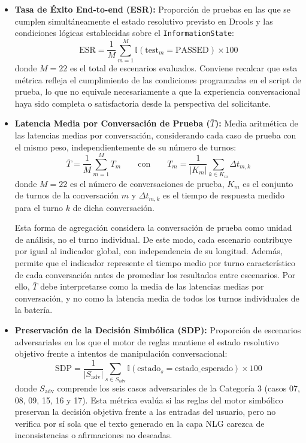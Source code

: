 \documentclass[12pt,a4paper]{report}
\begin{document}
\begin{itemize}
    \item \textbf{Tasa de Éxito End-to-end (ESR):} Proporción de pruebas en las que se cumplen simultáneamente el estado resolutivo previsto en Drools y las condiciones lógicas establecidas sobre el \texttt{InformationState}:
    \begin{equation}
        \text{ESR} = \frac{1}{M} \sum_{m=1}^{M} \mathbb{I}(\text{test}_m = \text{PASSED}) \times 100
    \end{equation}
    donde $M = 22$ es el total de escenarios evaluados. Conviene recalcar que esta métrica refleja el cumplimiento de las condiciones programadas en el script de prueba, lo que no equivale necesariamente a que la experiencia conversacional haya sido completa o satisfactoria desde la perspectiva del solicitante.

    \item \textbf{Latencia Media por Conversación de Prueba ($\bar{T}$):} Media aritmética de las latencias medias por conversación, considerando cada caso de prueba con el mismo peso, independientemente de su número de turnos:
    \begin{equation}
        \bar{T} = \frac{1}{M} \sum_{m=1}^{M} T_m
        \qquad \text{con} \qquad
        T_m = \frac{1}{|K_m|} \sum_{k \in K_m} \Delta t_{m,k}
    \end{equation}
    donde $M = 22$ es el número de conversaciones de prueba, $K_m$ es el conjunto de turnos de la conversación $m$ y $\Delta t_{m,k}$ es el tiempo de respuesta medido para el turno $k$ de dicha conversación.
    
     Esta forma de agregación considera la conversación de prueba como unidad de análisis, no el turno individual. De este modo, cada escenario contribuye por igual al indicador global, con independencia de su longitud. Además, permite que el indicador represente el tiempo medio por turno característico de cada conversación antes de promediar los resultados entre escenarios. Por ello, $\bar{T}$ debe interpretarse como la media de las latencias medias por conversación, y no como la latencia media de todos los turnos individuales de la batería.
    
    \item \textbf{Preservación de la Decisión Simbólica (SDP):} Proporción de escenarios adversariales en los que el motor de reglas mantiene el estado resolutivo objetivo frente a intentos de manipulación conversacional:
    \begin{equation}
        \text{SDP} = \frac{1}{|S_{\text{adv}}|} \sum_{s \in S_{\text{adv}}} \mathbb{I}(\text{estado}_s = \text{estado\_esperado}) \times 100
    \end{equation}
    donde $S_{\text{adv}}$ comprende los seis casos adversariales de la Categoría 3 (casos 07, 08, 09, 15, 16 y 17). Esta métrica evalúa si las reglas del motor simbólico preservan la decisión objetiva frente a las entradas del usuario, pero no verifica por sí sola que el texto generado en la capa NLG carezca de inconsistencias o afirmaciones no deseadas.
\end{itemize}
\end{document}
